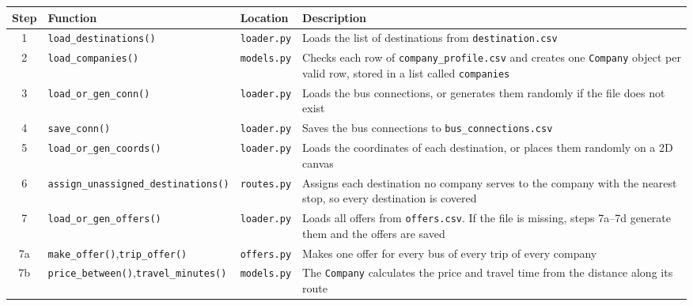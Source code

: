 
\begin{table}[htbp]
  \centering
  \small
  \renewcommand{\arraystretch}{1.6}
  \begin{tabularx}{\textwidth}{@{}c >{\raggedright\arraybackslash}p{4.6cm} >{\raggedright\arraybackslash}p{2.0cm} X@{}}
    \toprule
    \textbf{Step} & \textbf{Function} & \textbf{Location} & \textbf{Description} \\
    \midrule
    1 & \texttt{load\_destinations()} & \texttt{loader.py} & Loads the list of destinations from \texttt{destination.csv} \\
    2 & \texttt{load\_companies()} & \texttt{models.py} & Checks each row of \texttt{company\_profile.csv} and creates one \texttt{Company} object per valid row, stored in a list called \texttt{companies} \\
    3 & \texttt{load\_or\_gen\_conn()} & \texttt{loader.py} & Loads the bus connections, or generates them randomly if the file does not exist \\
    4 & \texttt{save\_conn()} & \texttt{loader.py} & Saves the bus connections to \texttt{bus\_connections.csv} \\
    5 & \texttt{load\_or\_gen\_coords()} & \texttt{loader.py} & Loads the coordinates of each destination, or places them randomly on a 2D canvas \\
    6 & \texttt{assign\_unassigned\_\allowbreak destinations()} & \texttt{routes.py} & Assigns each destination no company serves to the company with the nearest stop, so every destination is covered \\
    7 & \texttt{load\_or\_gen\_offers()} & \texttt{loader.py} & Loads all offers from \texttt{offers.csv}. If the file is missing, steps 7a--7d generate them and the offers are saved \\
    7a & \hspace*{1.5em}\texttt{make\_offer()},\newline\hspace*{1.5em}\texttt{trip\_offer()} & \texttt{offers.py} & Makes one offer for every bus of every trip of every company \\
    7b & \hspace*{1.5em}\texttt{price\_between()},\newline\hspace*{1.5em}\texttt{travel\_minutes()} & \texttt{models.py} & The \texttt{Company} calculates the price and travel time from the distance along its route \\

\end{tabularx}
\end{table}
